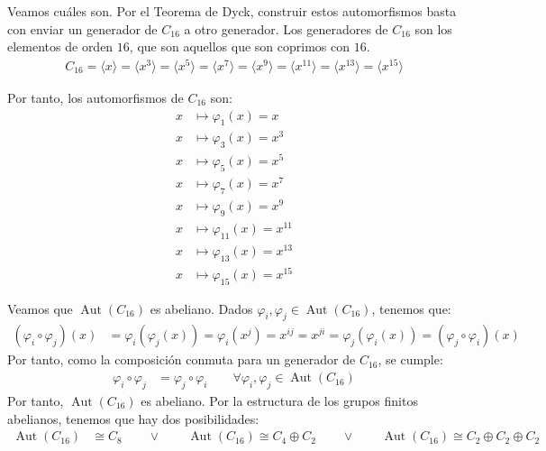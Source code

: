 \documentclass[12pt]{article}
\DeclareMathOperator{\Aut}{Aut}
\begin{document}
\begin{ejercicio}
\begin{enumerate}
            Veamos cuáles son. Por el Teorema de Dyck, construir estos automorfismos basta con enviar un generador de $C_{16}$ a otro generador. Los generadores de $C_{16}$ son los elementos de orden $16$, que son aquellos que son coprimos con $16$.
            \begin{align*}
                C_16 = \langle x\rangle
                = \langle x^3\rangle
                = \langle x^5\rangle
                = \langle x^7\rangle
                = \langle x^9\rangle
                = \langle x^{11}\rangle
                = \langle x^{13}\rangle
                = \langle x^{15}\rangle
            \end{align*}

            Por tanto, los automorfismos de $C_{16}$ son:
            \begin{align*}
                x &\mapsto \varphi_1(x) = x \\
                x &\mapsto \varphi_3(x) = x^3 \\
                x &\mapsto \varphi_5(x) = x^5 \\
                x &\mapsto \varphi_7(x) = x^7 \\
                x &\mapsto \varphi_9(x) = x^9 \\
                x &\mapsto \varphi_{11}(x) = x^{11} \\
                x &\mapsto \varphi_{13}(x) = x^{13} \\
                x &\mapsto \varphi_{15}(x) = x^{15}
            \end{align*}

            Veamos que $\Aut(C_{16})$ es abeliano. Dados $\varphi_i, \varphi_j \in \Aut(C_{16})$, tenemos que:
            \begin{align*}
                (\varphi_i \circ \varphi_j)(x) & = \varphi_i(\varphi_j(x)) = \varphi_i(x^j) = x^{ij} = x^{ji} = \varphi_j(\varphi_i(x)) = (\varphi_j \circ \varphi_i)(x)
            \end{align*}
            Por tanto, como la composición conmuta para un generador de $C_{16}$, se cumple:
            \begin{align*}
                \varphi_i \circ \varphi_j & = \varphi_j \circ \varphi_i\qquad \forall \varphi_i, \varphi_j \in \Aut(C_{16})
            \end{align*}
            Por tanto, $\Aut(C_{16})$ es abeliano. 
            Por la estructura de los grupos finitos abelianos, tenemos que hay dos posibilidades:
            \begin{align*}
                \Aut(C_{16}) & \cong C_8
                \qquad \lor \qquad
                \Aut(C_{16}) \cong C_4 \oplus C_2
                \qquad \lor \qquad
                \Aut(C_{16}) \cong C_2 \oplus C_2 \oplus C_2
            \end{align*}


\end{enumerate}
\end{ejercicio}
\end{document}
